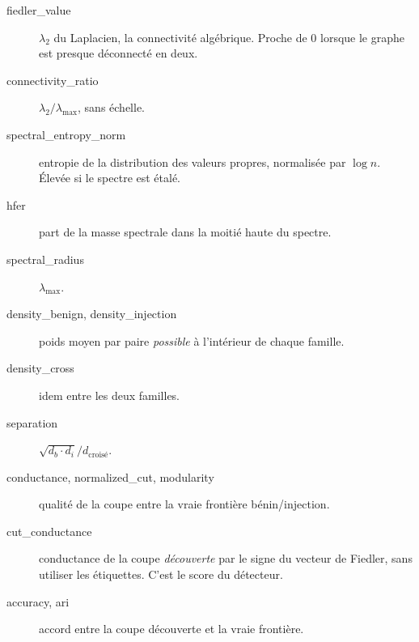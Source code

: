 \documentclass[11pt,a4paper]{article}
\begin{document}
\begin{description}
\item[fiedler\_value] $\lambda_2$ du Laplacien, la connectivité algébrique.
  Proche de 0 lorsque le graphe est presque déconnecté en deux.
\item[connectivity\_ratio] $\lambda_2 / \lambda_{\max}$, sans échelle.
\item[spectral\_entropy\_norm] entropie de la distribution des valeurs propres,
  normalisée par $\log n$. Élevée si le spectre est étalé.
\item[hfer] part de la masse spectrale dans la moitié haute du spectre.
\item[spectral\_radius] $\lambda_{\max}$.
\item[density\_benign, density\_injection] poids moyen par paire \emph{possible}
  à l'intérieur de chaque famille.
\item[density\_cross] idem entre les deux familles.
\item[separation] $\sqrt{d_b \cdot d_i} / d_{\text{croisé}}$.
\item[conductance, normalized\_cut, modularity] qualité de la coupe entre la
  vraie frontière bénin/injection.
\item[cut\_conductance] conductance de la coupe \emph{découverte} par le signe
  du vecteur de Fiedler, sans utiliser les étiquettes. C'est le score du
  détecteur.
\item[accuracy, ari] accord entre la coupe découverte et la vraie frontière.
\end{description}
\end{document}
